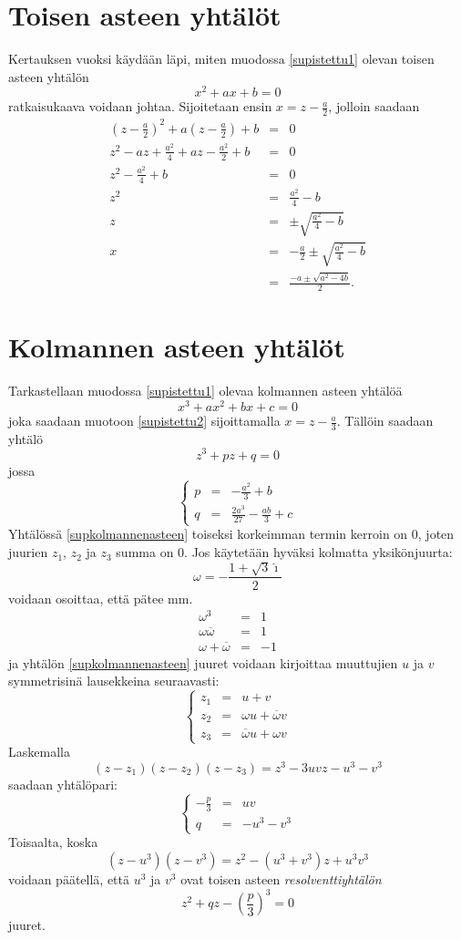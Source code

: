 \documentclass[a4paper]{article}
\begin{document}
\section{Toisen asteen yhtälöt}
Kertauksen vuoksi käydään läpi, miten muodossa \ref{supistettu1} olevan toisen asteen yhtälön
$$
x^2+ax+b=0
$$
ratkaisukaava voidaan johtaa. Sijoitetaan ensin $x=z-\frac{a}{2}$, jolloin saadaan
\begin{eqnarray*}
  \left(z-\frac{a}{2}\right)^2+a\left(z-\frac{a}{2}\right)+b & = & 0 \\
  z^2-az+\frac{a^2}{4}+az-\frac{a^2}{2}+b & = & 0 \\
  z^2-\frac{a^2}{4}+b & = & 0 \\
  z^2 & = & \frac{a^2}{4}-b \\
  z & = & \pm\sqrt{\frac{a^2}{4}-b} \\
  x & = & -\frac{a}{2}\pm\sqrt{\frac{a^2}{4}-b} \\
  & = & \frac{-a\pm\sqrt{a^2-4b}}{2}.
\end{eqnarray*}
\section{Kolmannen asteen yhtälöt}
Tarkastellaan muodossa \ref{supistettu1} olevaa kolmannen asteen yhtälöä
$$
x^3+ax^2+bx+c=0
$$
joka saadaan muotoon \ref{supistettu2} sijoittamalla $x=z-\frac{a}{3}$. Tällöin saadaan yhtälö
\begin{equation}
\label{supkolmannenasteen}
z^3+pz+q=0
\end{equation}
jossa
$$
\left\{
\begin{array}{ccc}
  p & = & -\frac{a^2}{3}+b \\
  q & = & \frac{2a^3}{27}-\frac{ab}{3}+c
\end{array}
\right.
$$
Yhtälössä \ref{supkolmannenasteen} toiseksi korkeimman termin kerroin on 0, joten juurien $z_1$, $z_2$ ja $z_3$ summa on 0. Jos käytetään hyväksi kolmatta yksikönjuurta:
$$
\omega=-\frac{1+\sqrt{3}\hat\imath}{2}
$$
voidaan osoittaa, että pätee mm.
\begin{eqnarray*}
  \omega^3 & = & 1 \\
  \omega\overline{\omega} & = & 1 \\
  \omega+\overline{\omega} & = & -1
\end{eqnarray*}
ja yhtälön \ref{supkolmannenasteen} juuret voidaan kirjoittaa muuttujien $u$ ja $v$ symmetrisinä lausekkeina seuraavasti:
$$
\left\{
\begin{array}{ccc}
  z_1 & = & u+v \\
  z_2 & = & \omega u+\overline{\omega} v \\
  z_3 & = & \overline{\omega} u+\omega v
\end{array}
\right.
$$
Laskemalla
$$
(z-z_1)(z-z_2)(z-z_3)=z^3-3uvz-u^3-v^3
$$
saadaan yhtälöpari:
$$
\left\{
\begin{array}{ccc}
  -\frac{p}{3} & = & uv \\
  q & = & -u^3-v^3
\end{array}
\right.
$$
Toisaalta, koska
$$
(z-u^3)(z-v^3)=z^2-(u^3+v^3)z+u^3 v^3
$$
voidaan päätellä, että $u^3$ ja $v^3$ ovat toisen asteen \emph{resolventtiyhtälön}
$$
z^2+qz-\left(\frac{p}{3}\right)^3=0
$$
juuret.
\end{document}
